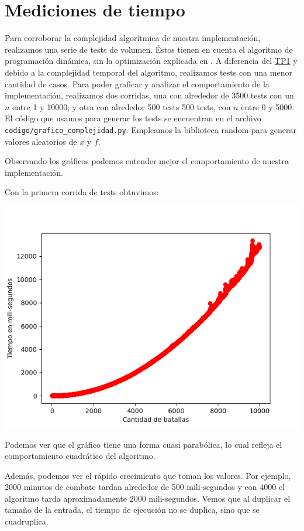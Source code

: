 \documentclass{article}
\begin{document}
\section{Mediciones de tiempo}
\label{sec:medTiempo}
Para corroborar la complejidad algorítmica de nuestra implementación, realizamos una serie de tests de volumen. Éstos tienen en cuenta el algoritmo de programación dinámica, sin la optimización explicada en . A diferencia del \href{https://github.com/La-sociedad-del-silencio/TP1-Greedy}{TP1} y debido a la complejidad temporal del algoritmo, realizamos tests con una menor cantidad de casos.
Para poder graficar y analizar el comportamiento de la implementación, realizamos dos corridas, una con alrededor de 3500 tests con un $n$ entre  1 y 10000; y otra con alrededor 500 tests 500 tests, con $n$ entre 0 y 5000. El código que usamos para generar los tests se encuentran en el archivo \texttt{codigo/grafico\_complejidad.py}. Empleamos la biblioteca random para generar valores aleatorios de $x$ y $f$.

Observando los gráficos podemos entender mejor el comportamiento de nuestra implementación. 

Con la primera corrida de tests obtuvimos:

\includegraphics[scale=0.69]{graficoComplejidadVintage.png}

Podemos ver que el gráfico tiene una forma cuasi parabólica, lo cual refleja el comportamiento cuadrático del algoritmo.

Además, podemos ver el rápido crecimiento que toman los valores. Por ejemplo, 2000 minutos de combate tardan alrededor de 500 mili-segundos y con 4000 el algoritmo tarda aproximadamente 2000 mili-segundos. Vemos que al duplicar el tamaño de la entrada, el tiempo de ejecución no se duplica, sino que se cuadruplica.
\end{document}
